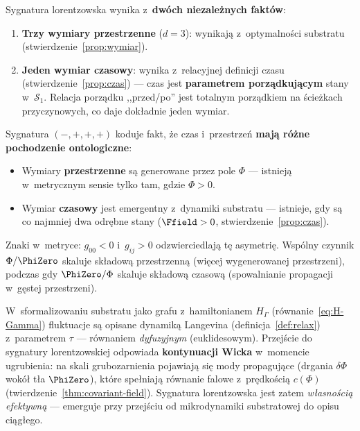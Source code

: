 \begin{proposition}\label{prop:sygnatura}
Sygnatura lorentzowska wynika z~\textbf{dw\'och niezale\.znych
fakt\'ow}:
\begin{enumerate}[nosep]
  \item \textbf{Trzy wymiary przestrzenne} ($d = 3$):
    wynikaj\k{a} z~optymalno\'sci substratu
    (stwierdzenie~\ref{prop:wymiar}).
  \item \textbf{Jeden wymiar czasowy}: wynika z~relacyjnej
    definicji czasu (stwierdzenie~\ref{prop:czas}) ---
    czas jest \textbf{parametrem porz\k{a}dkuj\k{a}cym}
    stany w~$\mathcal{S}_1$. Relacja porz\k{a}dku
    ,,przed/po'' jest totalnym porz\k{a}dkiem
    na \'scie\.zkach przyczynowych, co daje dok\l{}adnie
    jeden wymiar.
\end{enumerate}
Sygnatura $({-},{+},{+},{+})$ koduje fakt, \.ze czas
i~przestrze\'n \textbf{maj\k{a} r\'o\.zne pochodzenie ontologiczne}:
\begin{itemize}[nosep]
  \item Wymiary \textbf{przestrzenne} s\k{a} generowane przez
    pole $\Phi$ --- istniej\k{a} w~metrycznym sensie tylko
    tam, gdzie $\Phi > 0$.
  \item Wymiar \textbf{czasowy} jest emergentny z~dynamiki
    substratu --- istnieje, gdy s\k{a} co najmniej dwa
    odr\k{e}bne stany ($\Ffield > 0$,
    stwierdzenie~\ref{prop:czas}).
\end{itemize}
Znaki w~metryce:
$g_{00} < 0$ i~$g_{ij} > 0$ odzwierciedlaj\k{a} t\k{e}
asymetri\k{e}. Wsp\'olny czynnik $\Phi/\PhiZero$
skaluje sk\l{}adow\k{a} przestrzenn\k{a} (wi\k{e}cej
wygenerowanej przestrzeni), podczas gdy $\PhiZero/\Phi$
skaluje sk\l{}adow\k{a} czasow\k{a} (spowalnianie
propagacji w~g\k{e}stej przestrzeni).
\end{proposition}

\begin{remark}
W~sformalizowaniu substratu jako grafu z~hamiltonianem
$H_\Gamma$ (r\'ownanie~\ref{eq:H-Gamma}) fluktuacje
s\k{a} opisane dynamik\k{a} Langevina
(definicja~\ref{def:relax}) z~parametrem $\tau$
--- r\'ownaniem \emph{dyfuzyjnym} (euklidesowym).
Przej\'scie do sygnatury lorentzowskiej odpowiada
\textbf{kontynuacji Wicka} w~momencie ugrubienia:
na skali grubozarnienia pojawiaj\k{a} si\k{e} mody
propaguj\k{a}ce (drgania $\delta\Phi$ wok\'o\l{}
t\l{}a $\PhiZero$), kt\'ore spe\l{}niaj\k{a} r\'ownanie
falowe z~pr\k{e}dko\'sci\k{a} $c(\Phi)$
(twierdzenie~\ref{thm:covariant-field}).
Sygnatura lorentzowska jest zatem \emph{w\l{}asno\'sci\k{a}
efektywn\k{a}} --- emerguje przy przej\'sciu od
mikrodynamiki substratowej do opisu ci\k{a}g\l{}ego.
\end{remark}

